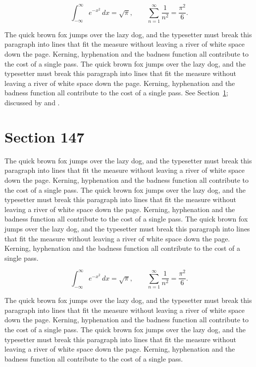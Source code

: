 \documentclass{article}
\begin{document}
\begin{equation}\label{eq:146}
\int_{-\infty}^{\infty} e^{-x^{2}}\,dx = \sqrt{\pi}, \qquad
\sum_{n=1}^{\infty} \frac{1}{n^{2}} = \frac{\pi^{2}}{6}.
\end{equation}

The quick brown fox jumps over the lazy dog, and the typesetter must break this paragraph into lines that fit the measure without leaving a river of white space down the page. Kerning, hyphenation and the badness function all contribute to the cost of a single pass. The quick brown fox jumps over the lazy dog, and the typesetter must break this paragraph into lines that fit the measure without leaving a river of white space down the page. Kerning, hyphenation and the badness function all contribute to the cost of a single pass. 
See Section~\ref{sec:147}; discussed by \textcite{k2} and \textcite{l4}.
\section{Section 147}
\label{sec:147}
The quick brown fox jumps over the lazy dog, and the typesetter must break this paragraph into lines that fit the measure without leaving a river of white space down the page. Kerning, hyphenation and the badness function all contribute to the cost of a single pass. The quick brown fox jumps over the lazy dog, and the typesetter must break this paragraph into lines that fit the measure without leaving a river of white space down the page. Kerning, hyphenation and the badness function all contribute to the cost of a single pass. The quick brown fox jumps over the lazy dog, and the typesetter must break this paragraph into lines that fit the measure without leaving a river of white space down the page. Kerning, hyphenation and the badness function all contribute to the cost of a single pass. 

\begin{equation}\label{eq:147}
\int_{-\infty}^{\infty} e^{-x^{2}}\,dx = \sqrt{\pi}, \qquad
\sum_{n=1}^{\infty} \frac{1}{n^{2}} = \frac{\pi^{2}}{6}.
\end{equation}

The quick brown fox jumps over the lazy dog, and the typesetter must break this paragraph into lines that fit the measure without leaving a river of white space down the page. Kerning, hyphenation and the badness function all contribute to the cost of a single pass. The quick brown fox jumps over the lazy dog, and the typesetter must break this paragraph into lines that fit the measure without leaving a river of white space down the page. Kerning, hyphenation and the badness function all contribute to the cost of a single pass. 
\end{document}
